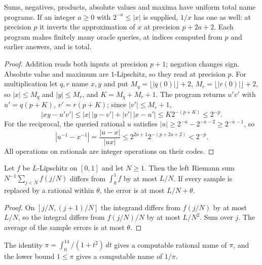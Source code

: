 \begin{proposition}\label{prop:efd-closure}
Sums, negatives, products, absolute values and maxima have uniform total name programs. If an integer $a\ge0$
with $2^{-a}\le|x|$ is supplied, $1/x$ has one as well: at precision $p$ it inverts the approximation of $x$ at
precision $p+2a+2$. Each program makes finitely many oracle queries, at indices computed from $p$ and earlier
answers, and is total.
\end{proposition}

\begin{proof}
Addition reads both inputs at precision $p+1$; negation changes sign. Absolute value and maximum are
$1$-Lipschitz, so they read at precision $p$. For multiplication let $q,r$ name $x,y$ and put
$M_q=\lfloor|q(0)|\rfloor+2$, $M_r=\lfloor|r(0)|\rfloor+2$, so $|x|\le M_q$ and $|y|\le M_r$, and $K=M_q+M_r+1$.
The program returns $u'v'$ with $u'=q(p+K)$, $v'=r(p+K)$; since $|v'|\le M_r+1$,
\[
 |xy-u'v'|\le|x|\,|y-v'|+|v'|\,|x-u'|\le K2^{-(p+K)}\le2^{-p}.
\]
For the reciprocal, the queried rational $u$ satisfies $|u|\ge2^{-a}-2^{-a-2}\ge2^{-a-1}$, so
\[
 |u^{-1}-x^{-1}|=\frac{|u-x|}{|ux|}\le2^{2a+1}2^{-(p+2a+2)}<2^{-p}.
\]
All operations on rationals are integer operations on their codes.
\end{proof}

\begin{lemma}[Quadrature]\label{lem:efd-quadrature}
Let $f$ be $L$-Lipschitz on $[0,1]$ and let $N\ge1$. Then the left Riemann sum
$N^{-1}\sum_{j<N}f(j/N)$ differs from $\int_0^1f$ by at most $L/N$. If every sample is replaced by a rational within $\theta$, the error is at most
$L/N+\theta$.
\end{lemma}

\begin{proof}
On $[j/N,(j+1)/N]$ the integrand differs from $f(j/N)$ by at most $L/N$, so the integral differs from $f(j/N)/N$ by
at most $L/N^2$. Sum over $j$. The average of the sample errors is at most $\theta$.
\end{proof}

\begin{lemma}[A name of $\pi$]\label{lem:efd-pi}
The identity $\pi=\int_0^14/(1+t^2)\,dt$ gives a computable rational name of $\pi$, and the lower bound $1\le\pi$
gives a computable name of $1/\pi$.
\end{lemma}

